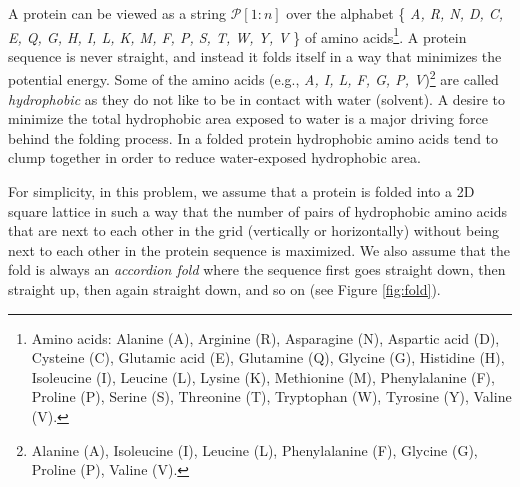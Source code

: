 \documentclass[11pt]{article}
\newcommand{\m}{\mathcal}
\begin{document}
A protein can be viewed as a string $\m{P}[1 : n]$ over the
alphabet \{ {\em A, R, N, D, C, E, Q, G, H, I, L, K, M, F, P, S, T, W, Y, V } \}
of amino acids\footnote{Amino acids: Alanine (A), Arginine (R), Asparagine (N),
Aspartic acid (D), Cysteine (C), Glutamic acid (E), Glutamine (Q), Glycine (G),
Histidine (H), Isoleucine (I), Leucine (L), Lysine (K), Methionine (M),
Phenylalanine (F), Proline (P), Serine (S), Threonine (T), Tryptophan (W),
Tyrosine (Y), Valine (V).}. A protein sequence is never straight, and instead
it folds itself in a way that minimizes the potential energy. Some of the amino 
acids (e.g., {\em A, I, L, F, G, P, V})\footnote{Alanine (A), Isoleucine (I), 
Leucine (L), Phenylalanine (F), Glycine (G), Proline (P), Valine (V).} are 
called {\em hydrophobic} as they do not like to be in contact with water (solvent).
A desire to minimize the total hydrophobic area exposed to water is a major driving force 
behind the folding process. In a folded protein hydrophobic amino acids
tend to clump together in order to reduce water-exposed hydrophobic area.

For simplicity, in this problem, we assume that a protein is folded into a 2D square lattice
in such a way that the number of pairs of hydrophobic amino acids that are next to each other 
in the grid (vertically or horizontally) without being next to each other in the protein
sequence is maximized. We also assume that the fold is always an {\em accordion fold} where the sequence first
goes straight down, then straight up, then again straight down, and so on (see Figure \ref{fig:fold}).
\end{document}
